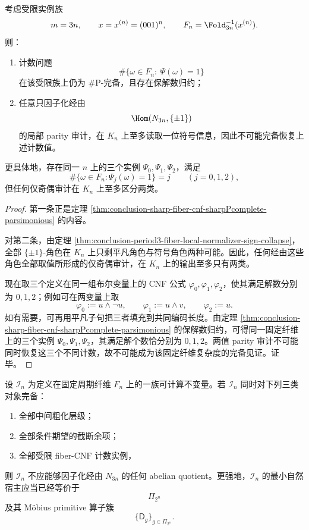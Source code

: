 \begin{theorem}\label{thm:conclusion-period3-fiber-parity-only-not-count-complete}
考虑受限实例族
\[
m=3n,
\qquad
x=x^{(n)}=(001)^n,
\qquad
F_n=\Fold_{3n}^{-1}(x^{(n)}).
\]
则：
\begin{enumerate}
  \item 计数问题
  \[
  \#\{\omega\in F_n:\ \Psi(\omega)=1\}
  \]
  在该受限族上仍为 \(\#\mathrm P\)-完备，且存在保解数归约；
  \item 任意只因子化经由
  \[
  \Hom(N_{3n},\{\pm1\})
  \]
  的局部 parity 审计，在 \(K_n\) 上至多读取一位符号信息，因此不可能完备恢复上述计数值。
\end{enumerate}
更具体地，存在同一 \(n\) 上的三个实例 \(\Psi_0,\Psi_1,\Psi_2\)，满足
\[
\#\{\omega\in F_n:\Psi_j(\omega)=1\}=j
\qquad(j=0,1,2),
\]
但任何仅奇偶审计在 \(K_n\) 上至多区分两类。
\end{theorem}
\begin{proof}
第一条正是定理 \ref{thm:conclusion-sharp-fiber-cnf-sharpPcomplete-parsimonious} 的内容。

对第二条，由定理 \ref{thm:conclusion-period3-fiber-local-normalizer-sign-collapse}，全部 \(\{\pm1\}\)-角色在 \(K_n\) 上只剩平凡角色与符号角色两种可能。因此，任何经由这些角色全部取值所形成的仅奇偶审计，在 \(K_n\) 上的输出至多只有两类。

现在取三个定义在同一组布尔变量上的 CNF 公式 \(\varphi_0,\varphi_1,\varphi_2\)，使其满足解数分别为 \(0,1,2\)；例如可在两变量上取
\[
\varphi_0:=u\wedge\neg u,\qquad
\varphi_1:=u\wedge v,\qquad
\varphi_2:=u.
\]
如有需要，可再用平凡子句把三者填充到共同编码长度。由定理 \ref{thm:conclusion-sharp-fiber-cnf-sharpPcomplete-parsimonious} 的保解数归约，可得同一固定纤维上的三个实例 \(\Psi_0,\Psi_1,\Psi_2\)，其满足解个数恰分别为 \(0,1,2\)。两值 parity 审计不可能同时恢复这三个不同计数，故不可能成为该固定纤维复杂度的完备见证。证毕。
\end{proof}

\begin{conjecture}\label{conj:conclusion-period3-fiber-mobius-partition-minimal-audit}
设 \(\mathcal I_n\) 为定义在固定周期纤维 \(F_n\) 上的一族可计算不变量。若 \(\mathcal I_n\) 同时对下列三类对象完备：
\begin{enumerate}
  \item 全部中间粗化层级；
  \item 全部条件期望的截断余项；
  \item 全部受限 fiber-CNF 计数实例，
\end{enumerate}
则 \(\mathcal I_n\) 不应能够因子化经由 \(N_{3n}\) 的任何 abelian quotient。更强地，\(\mathcal I_n\) 的最小自然宿主应当已经等价于
\[
\Pi_{2^n}
\]
及其 Möbius primitive 算子簇
\[
\{\mathsf D_g\}_{g\in\Pi_{2^n}}.
\]
\end{conjecture}
